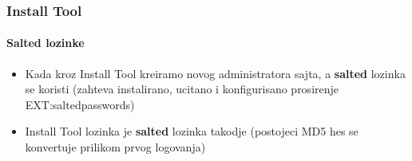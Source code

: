 \begin{frame}[fragile]
\end{frame}


\begin{frame}[fragile]
	\frametitle{Install Tool}
	\framesubtitle{Salted lozinke}

	\begin{itemize}
		\item Kada kroz Install Tool kreiramo novog administratora sajta,\newline
			a \textbf{salted} lozinka se koristi\newline
			\smaller(zahteva instalirano, ucitano i konfigurisano prosirenje EXT:saltedpasswords)\normalsize
		\item Install Tool lozinka je \textbf{salted} lozinka takodje\newline
			\smaller(postojeci MD5 hes se konvertuje prilikom prvog logovanja)\normalsize
	\end{itemize}


\end{frame}
